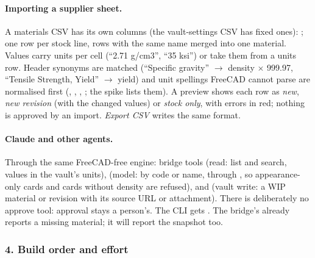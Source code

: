 \paragraph{Importing a supplier sheet.} A materials CSV has its own columns (the vault-settings CSV has fixed ones):
; one row per stock line, rows with the same name merged into one material. Values
carry units per cell (``2.71 g/cm3'', ``35 ksi'') or take them from a units row. Header synonyms are matched (``Specific
gravity'' $\rightarrow$ density $\times$ 999.97, ``Tensile Strength, Yield'' $\rightarrow$ yield) and unit spellings FreeCAD
cannot parse are normalised first (, , , ; the spike lists them). A preview shows
each row as \emph{new}, \emph{new revision} (with the changed values) or \emph{stock only}, with errors in red;
nothing is approved by an import. \emph{Export CSV} writes the same format.

\paragraph{Claude and other agents.} Through the same FreeCAD-free engine: bridge tools  (read: list
and search, values in the vault's units),  (model: by code or name, through , so
appearance-only cards and cards without density are refused), and  (vault write: a WIP
material or revision with its source URL or attachment). There is deliberately no approve tool: approval stays a person's.
The CLI gets . The bridge's
 already reports a missing material; it will report the snapshot too.

\subsubsection*{4. Build order and effort}

